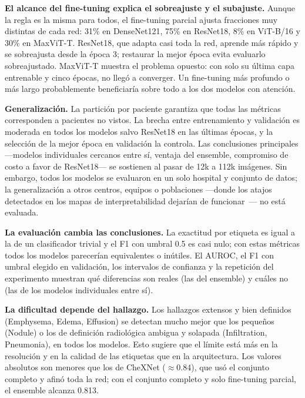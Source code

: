 \documentclass[conference]{IEEEtran}
\begin{document}
\textbf{El alcance del fine-tuning explica el sobreajuste y el subajuste.} Aunque la regla es la misma para todos, el fine-tuning parcial ajusta fracciones muy distintas de cada red: 31\% en DenseNet121, 75\% en ResNet18, 8\% en ViT-B/16 y 30\% en MaxViT-T. ResNet18, que adapta casi toda la red, aprende más rápido y se sobreajusta desde la época 3; restaurar la mejor época evita evaluarlo sobreajustado. MaxViT-T muestra el problema opuesto: con solo su última capa entrenable y cinco épocas, no llegó a converger. Un fine-tuning más profundo o más largo probablemente beneficiaría sobre todo a los dos modelos con atención.

\textbf{Generalización.} La partición por paciente garantiza que todas las métricas corresponden a pacientes no vistos. La brecha entre entrenamiento y validación es moderada en todos los modelos salvo ResNet18 en las últimas épocas, y la selección de la mejor época en validación la controla. Las conclusiones principales ---modelos individuales cercanos entre sí, ventaja del ensemble, compromiso de costo a favor de ResNet18--- se sostienen al pasar de 12k a 112k imágenes. Sin embargo, todos los modelos se evaluaron en un solo hospital y conjunto de datos; la generalización a otros centros, equipos o poblaciones ---donde los atajos detectados en los mapas de interpretabilidad dejarían de funcionar~\cite{zech2018variable}--- no está evaluada.

\textbf{La evaluación cambia las conclusiones.} La exactitud por etiqueta es igual a la de un clasificador trivial y el F1 con umbral 0.5 es casi nulo; con estas métricas todos los modelos parecerían equivalentes o inútiles. El AUROC, el F1 con umbral elegido en validación, los intervalos de confianza y la repetición del experimento muestran qué diferencias son reales (las del ensemble) y cuáles no (las de los modelos individuales entre sí).

\textbf{La dificultad depende del hallazgo.} Los hallazgos extensos y bien definidos (Emphysema, Edema, Effusion) se detectan mucho mejor que los pequeños (Nodule) o los de definición radiológica ambigua y solapada (Infiltration, Pneumonia), en todos los modelos. Esto sugiere que el límite está más en la resolución y en la calidad de las etiquetas que en la arquitectura. Los valores absolutos son menores que los de CheXNet ($\approx$0.84), que usó el conjunto completo y afinó toda la red; con el conjunto completo y solo fine-tuning parcial, el ensemble alcanza 0.813.
\end{document}
